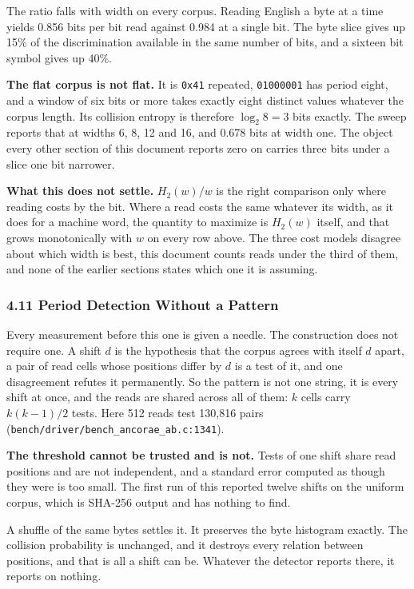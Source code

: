 The ratio falls with width on every corpus. Reading English a byte at a time yields 0.856 bits per bit read against 0.984 at a single bit. The byte slice gives up 15\% of the discrimination available in the same number of bits, and a sixteen bit symbol gives up 40\%.

\noindent\textbf{The flat corpus is not flat.} It is \texttt{0x41} repeated, \texttt{01000001} has period eight, and a window of six bits or more takes exactly eight distinct values whatever the corpus length. Its collision entropy is therefore \(\log_2 8 = 3\) bits exactly. The sweep reports that at widths 6, 8, 12 and 16, and 0.678 bits at width one. The object every other section of this document reports zero on carries three bits under a slice one bit narrower.

\noindent\textbf{What this does not settle.} \(H_2(w)/w\) is the right comparison only where reading costs by the bit. Where a read costs the same whatever its width, as it does for a machine word, the quantity to maximize is \(H_2(w)\) itself, and that grows monotonically with \(w\) on every row above. The three cost models disagree about which width is best, this document counts reads under the third of them, and none of the earlier sections states which one it is assuming.

\subsubsection{4.11 Period Detection Without a Pattern}

Every measurement before this one is given a needle. The construction does not require one. A shift \(d\) is the hypothesis that the corpus agrees with itself \(d\) apart, a pair of read cells whose positions differ by \(d\) is a test of it, and one disagreement refutes it permanently. So the pattern is not one string, it is every shift at once, and the reads are shared across all of them: \(k\) cells carry \(k(k-1)/2\) tests. Here 512 reads test 130,816 pairs (\texttt{bench/\allowbreak{}driver/\allowbreak{}bench\_\allowbreak{}ancorae\_\allowbreak{}ab.\allowbreak{}c:1341}).

\noindent\textbf{The threshold cannot be trusted and is not.} Tests of one shift share read positions and are not independent, and a standard error computed as though they were is too small. The first run of this reported twelve shifts on the uniform corpus, which is SHA-256 output and has nothing to find.

A shuffle of the same bytes settles it. It preserves the byte histogram exactly. The collision probability is unchanged, and it destroys every relation between positions, and that is all a shift can be. Whatever the detector reports there, it reports on nothing.

